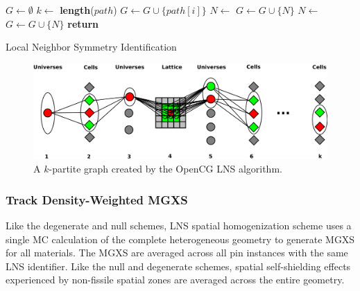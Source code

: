 \begin{algorithm*}[h!]
\begin{algorithmic}[1]
    \State $G \gets \emptyset$ 
    \State $k \gets$ \textbf{length}($path$) 
            \State $G \gets G \cup \{path[i]\}$ 
            \State $N \gets$  
            \State $G \gets G \cup \{N\}$ 
            \State $N \gets$  
            \State $G \gets G \cup \{N\}$ 
        \EndIf
    \EndFor
    \State \textbf{return}  
\EndProcedure
\caption{Local Neighbor Symmetry Identification}
\label{alg:lns}
\end{algorithmic}
\end{algorithm*}

\begin{figure}[h!]
  \centering
  \includegraphics[width=0.8\linewidth]{figures/lns-k-partite-graph}
  \caption{A $k$-partite graph created by the OpenCG LNS algorithm.}
  \label{fig:lns-k-partite-graph}
\end{figure}

\subsubsection{Track Density-Weighted MGXS}
\label{subsubsec:lns-math}

Like the degenerate and null schemes, LNS spatial homogenization scheme uses a single MC calculation of the complete heterogeneous geometry to generate MGXS for all materials. The MGXS are averaged across all pin instances with the same LNS identifier. Like the null and degenerate schemes, spatial self-shielding effects experienced by non-fissile spatial zones are averaged across the entire geometry. 

